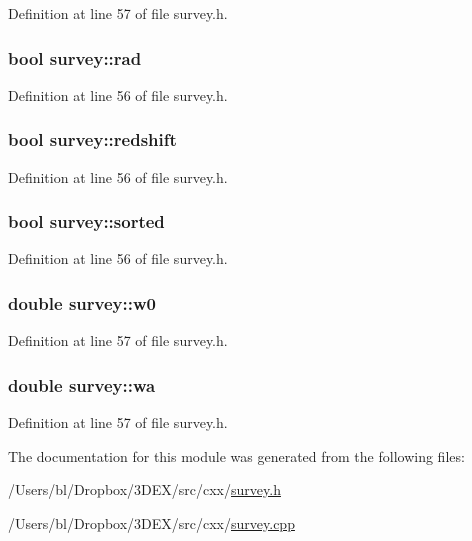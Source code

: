 Definition at line 57 of file survey.h.

\hypertarget{modulesurvey_a8f30a6ca63dd3c3abe8ed1700849b399}{
\subsubsection[{rad}]{\setlength{\rightskip}{0pt plus 5cm}bool {\bf survey::rad}}}
\label{modulesurvey_a8f30a6ca63dd3c3abe8ed1700849b399}


Definition at line 56 of file survey.h.

\hypertarget{modulesurvey_af50a00fbd76d31c442c83c310673bc48}{
\subsubsection[{redshift}]{\setlength{\rightskip}{0pt plus 5cm}bool {\bf survey::redshift}}}
\label{modulesurvey_af50a00fbd76d31c442c83c310673bc48}


Definition at line 56 of file survey.h.

\hypertarget{modulesurvey_a31df3e0a4afb61109790b98e8dc7cebf}{
\subsubsection[{sorted}]{\setlength{\rightskip}{0pt plus 5cm}bool {\bf survey::sorted}}}
\label{modulesurvey_a31df3e0a4afb61109790b98e8dc7cebf}


Definition at line 56 of file survey.h.

\hypertarget{modulesurvey_ad51507ebe1e5898954d5fb5d0b318c61}{
\subsubsection[{w0}]{\setlength{\rightskip}{0pt plus 5cm}double {\bf survey::w0}}}
\label{modulesurvey_ad51507ebe1e5898954d5fb5d0b318c61}


Definition at line 57 of file survey.h.

\hypertarget{modulesurvey_a496fd2e71e2da932fb9c6f591cd98bf5}{
\subsubsection[{wa}]{\setlength{\rightskip}{0pt plus 5cm}double {\bf survey::wa}}}
\label{modulesurvey_a496fd2e71e2da932fb9c6f591cd98bf5}


Definition at line 57 of file survey.h.



The documentation for this module was generated from the following files:\begin{DoxyCompactItemize}
\item 
/Users/bl/Dropbox/3DEX/src/cxx/\hyperlink{survey_8h}{survey.h}\item 
/Users/bl/Dropbox/3DEX/src/cxx/\hyperlink{survey_8cpp}{survey.cpp}\end{DoxyCompactItemize}
